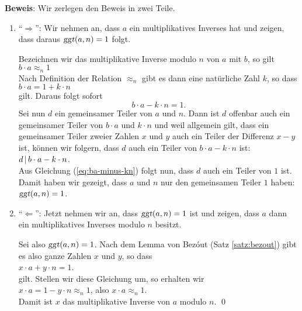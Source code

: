 \noindent
\textbf{Beweis}: Wir zerlegen den Beweis in zwei Teile.
\begin{enumerate}
\item ``$\Rightarrow$'':  Wir nehmen an, dass $a$ ein multiplikatives Inverses hat und zeigen,
      dass daraus $\textsl{ggt}(a,n) = 1$ folgt.

      Bezeichnen wir das multiplikative Inverse modulo $n$ von $a$ mit $b$, so gilt
      \\[0.2cm]
      \hspace*{1.3cm}
      $b \cdot a \approx_n 1$
      \\[0.2cm]
      Nach Definition der Relation $\approx_n$ gibt es dann eine natürliche Zahl $k$, so dass
      \\[0.2cm]
      \hspace*{1.3cm}
      $b \cdot a = 1 + k \cdot n$
      \\[0.2cm]
      gilt.  Daraus folgt sofort
      \begin{equation}
        \label{eq:ba-minus-kn}
      b \cdot a - k \cdot n = 1.         
      \end{equation}
      Sei nun $d$ ein gemeinsamer Teiler von $a$ und $n$.  Dann ist $d$ offenbar auch ein
      gemeinsamer Teiler von $b \cdot a$ und $k \cdot n$ und weil allgemein gilt, dass ein
      gemeinsamer Teiler zweier Zahlen $x$ und $y$ auch ein Teiler der Differenz $x - y$ ist, 
      können wir folgern, dass $d$ auch ein Teiler von $b \cdot a - k \cdot n$ ist:
      \\[0.2cm]
      \hspace*{1.3cm}
      $d \,|\, b \cdot a - k \cdot n$.
      \\[0.2cm]
      Aus Gleichung (\ref{eq:ba-minus-kn}) folgt nun, dass $d$ auch ein Teiler von $1$ ist.
      Damit haben wir gezeigt, dass $a$ und $n$ nur den gemeinsamen Teiler $1$ haben:
      \\[0.2cm]
      \hspace*{1.3cm}
      $\textsl{ggt}(a, n) = 1$.
\item ``$\Leftarrow$'': Jetzt nehmen wir an, dass $\textsl{ggt}(a, n) = 1$ ist und zeigen, dass
      $a$ dann ein multiplikatives Inverses modulo $n$ besitzt.

      Sei also $\textsl{ggt}(a, n) = 1$.  Nach dem Lemma von Bez\'out (Satz \ref{satz:bezout})
      gibt es also ganze Zahlen $x$ und $y$, so dass 
      \\[0.2cm]
      \hspace*{1.3cm}
      $x \cdot a + y \cdot n = 1$.
      \\[0.2cm]
      gilt. Stellen wir diese Gleichung um, so erhalten wir
      \\[0.2cm]
      \hspace*{1.3cm}
      $x \cdot a = 1 - y \cdot n \approx_n 1$, \quad also $x \cdot a \approx_n 1$.
      \\[0.2cm]
      Damit ist $x$ das multiplikative Inverse von $a$ modulo $n$. \qed
\end{enumerate}

